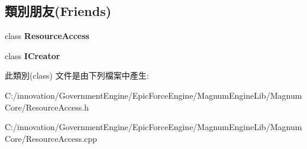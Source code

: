\subsection*{類別朋友(Friends)}
\begin{DoxyCompactItemize}
\item 
class {\bfseries Resource\+Access}\hypertarget{class_i_dream_sky_1_1_resource_access_1_1_factory_a3a26a4a200b91c31f27b5e173018a17c}{}\label{class_i_dream_sky_1_1_resource_access_1_1_factory_a3a26a4a200b91c31f27b5e173018a17c}

\item 
class {\bfseries I\+Creator}\hypertarget{class_i_dream_sky_1_1_resource_access_1_1_factory_a6d6e56ac47edfce9d2590e0757222ded}{}\label{class_i_dream_sky_1_1_resource_access_1_1_factory_a6d6e56ac47edfce9d2590e0757222ded}

\end{DoxyCompactItemize}


此類別(class) 文件是由下列檔案中產生\+:\begin{DoxyCompactItemize}
\item 
C\+:/innovation/\+Government\+Engine/\+Epic\+Force\+Engine/\+Magnum\+Engine\+Lib/\+Magnum\+Core/Resource\+Access.\+h\item 
C\+:/innovation/\+Government\+Engine/\+Epic\+Force\+Engine/\+Magnum\+Engine\+Lib/\+Magnum\+Core/Resource\+Access.\+cpp\end{DoxyCompactItemize}
